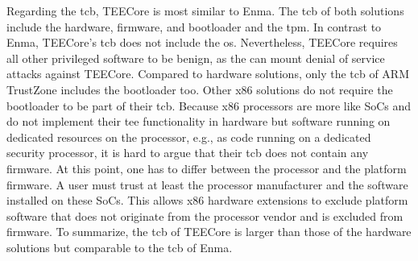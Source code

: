 Regarding the \gls{tcb}, TEECore is most similar to Enma. The \gls{tcb} of both
solutions include the hardware, firmware, and bootloader and the \gls{tpm}. In
contrast to Enma, TEECore's \gls{tcb} does not include the \gls{os}.
Nevertheless, TEECore requires all other privileged software to be benign, as
the can mount denial of service attacks against TEECore. Compared to hardware
solutions, only the \gls{tcb} of ARM TrustZone includes the bootloader too.
Other x86 solutions do not require the bootloader to be part of their \gls{tcb}.
Because x86 processors are more like SoCs and do not implement their \gls{tee}
functionality in hardware but software running on dedicated resources on the
processor, e.g., as code running on a dedicated security processor, it is hard
to argue that their \gls{tcb} does not contain any firmware. At this point, one
has to differ between the processor and the platform firmware. A user must trust
at least the processor manufacturer and the software installed on these SoCs.
This allows x86 hardware extensions to exclude platform software that does not
originate from the processor vendor and is excluded from firmware. To summarize,
the \gls{tcb} of TEECore is larger than those of the hardware solutions but
comparable to the \gls{tcb} of Enma.

